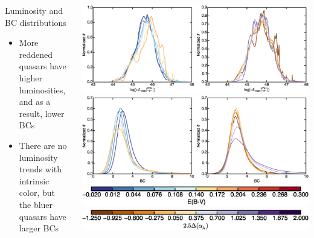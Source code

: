 \documentclass[landscape,9pt]{beamer}
\begin{document}
\begin{frame}
	\begin{columns}
	\begin{column}{.35\textwidth}
		\begin{block}{Luminosity and \\ BC distributions}
		\begin{itemize}
			\item More reddened quasars have higher luminosities, and as a result, lower BCs
			\item There are no luminosity trends with intrinsic color, but the bluer quasars have larger BCs
		\end{itemize}
		\end{block}
	\end{column}
	\begin{column}{.75\textwidth}
		\includegraphics[width=\textwidth]{../images/BH/f6a}\\
		\includegraphics[width=\textwidth]{../images/BH/f6b}\\
		\hspace{2mm}\includegraphics[width=.47\textwidth]{../images/BH/ebv_colorbar} 
		\hspace{2.5mm}\includegraphics[width=.47\textwidth]{../images/BH/alpha_colorbar}
	\end{column}
	\end{columns}
\end{frame}
\end{document}
